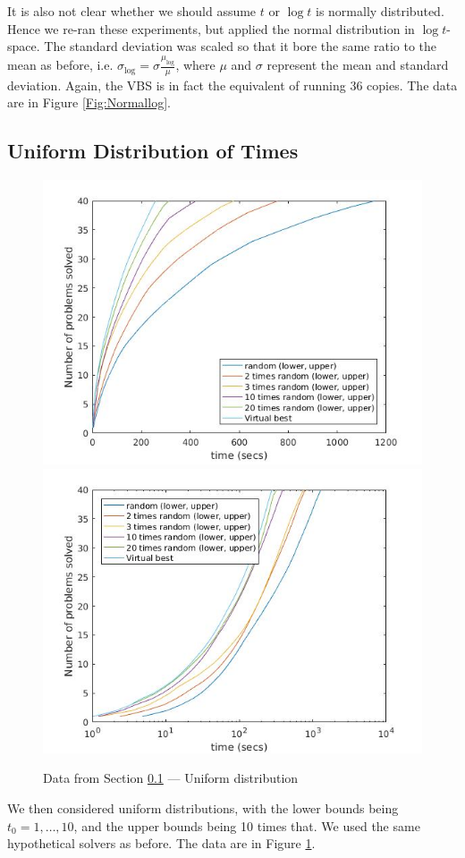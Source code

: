 \documentclass{easychair}
\begin{document}
It is also not clear whether we should assume $t$ or $\log t$ is normally distributed. Hence we re-ran these experiments, but applied the normal distribution in $\log t$-space. The standard deviation was scaled so that it bore the same ratio to the mean as before, i.e. $\sigma_{\log}=\sigma\frac{\mu_{\log}}\mu$, where $\mu$ and $\sigma$ represent the mean and standard deviation.
Again, the VBS is in fact the equivalent of running 36 copies.
The data are in Figure  \ref{Fig:Normallog}.
\subsection{Uniform Distribution of Times}\label{sec:Uniform}
\begin{figure}[h]
\caption{Data from Section \ref{sec:Uniform} --- Uniform distribution\label{Fig:Uniform}}
\includegraphics[scale=0.4]{Runif20.jpg}
\includegraphics[scale=0.4]{Rlogunif20.jpg}
\end{figure}
We then considered uniform distributions, with the lower bounds being $t_0=1,\ldots,10$, and the upper bounds being 10 times that. We used the same hypothetical solvers as before.
The data are in Figure  \ref{Fig:Uniform}.
\end{document}
